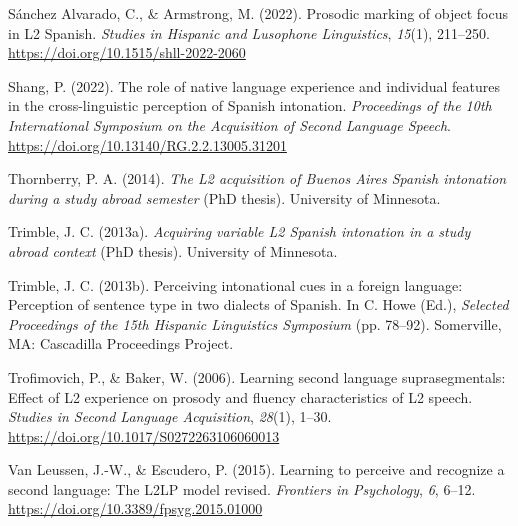 \documentclass[]{article}
\newlength{\cslhangindent}
\newenvironment{CSLReferences}[2] %
 {%
  \setlength{\parindent}{0pt}
  \ifodd #1 \everypar{\setlength{\hangindent}{\cslhangindent}}\ignorespaces\fi
  \ifnum #2 > 0
  \setlength{\parskip}{#2\baselineskip}
  \fi
 }%
 {}
\begin{document}
\begin{CSLReferences}{1}{0}
\leavevmode{}%
Sánchez Alvarado, C., \& Armstrong, M. (2022). Prosodic marking of object focus in {L}2 {S}panish. \emph{Studies in Hispanic and Lusophone Linguistics}, \emph{15}(1), 211--250. \url{https://doi.org/10.1515/shll-2022-2060}

\leavevmode{}%
Shang, P. (2022). The role of native language experience and individual features in the cross-linguistic perception of {S}panish intonation. \emph{Proceedings of the 10th International Symposium on the Acquisition of Second Language Speech}. \url{https://doi.org/10.13140/RG.2.2.13005.31201}

\leavevmode{}%
Thornberry, P. A. (2014). \emph{The {L}2 acquisition of {B}uenos {A}ires {S}panish intonation during a study abroad semester} (PhD thesis). University of Minnesota.

\leavevmode{}%
Trimble, J. C. (2013a). \emph{Acquiring variable {L}2 {S}panish intonation in a study abroad context} (PhD thesis). University of Minnesota.

\leavevmode{}%
Trimble, J. C. (2013b). Perceiving intonational cues in a foreign language: {P}erception of sentence type in two dialects of {S}panish. In C. Howe (Ed.), \emph{{Selected Proceedings of the 15th Hispanic Linguistics Symposium}} (pp. 78--92). Somerville, MA: Cascadilla Proceedings Project.

\leavevmode{}%
Trofimovich, P., \& Baker, W. (2006). Learning second language suprasegmentals: Effect of {L}2 experience on prosody and fluency characteristics of {L}2 speech. \emph{Studies in Second Language Acquisition}, \emph{28}(1), 1--30. \url{https://doi.org/10.1017/S0272263106060013}

\leavevmode{}%
Van Leussen, J.-W., \& Escudero, P. (2015). Learning to perceive and recognize a second language: {T}he {L2LP} model revised. \emph{Frontiers in Psychology}, \emph{6}, 6--12. \url{https://doi.org/10.3389/fpsyg.2015.01000}

\end{CSLReferences}
\end{document}
